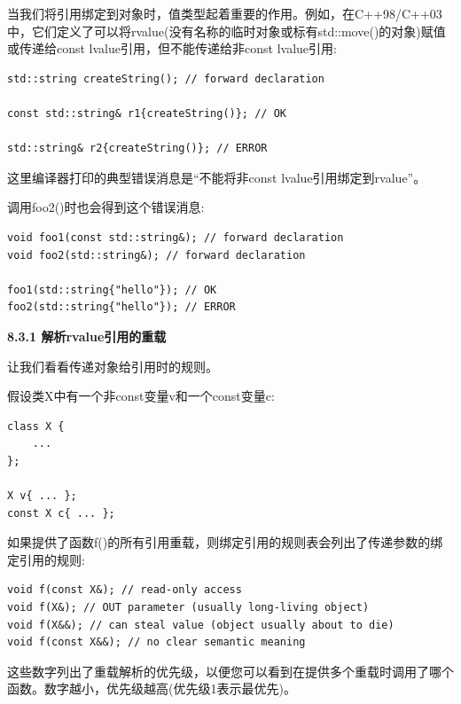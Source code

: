 当我们将引用绑定到对象时，值类型起着重要的作用。例如，在C++98/C++03中，它们定义了可以将rvalue(没有名称的临时对象或标有std::move()的对象)赋值或传递给const lvalue引用，但不能传递给非const lvalue引用:\par

\begin{lstlisting}[caption={}]
std::string createString(); // forward declaration

const std::string& r1{createString()}; // OK

std::string& r2{createString()}; // ERROR
\end{lstlisting}

这里编译器打印的典型错误消息是“不能将非const lvalue引用绑定到rvalue”。\par

调用foo2()时也会得到这个错误消息:\par

\begin{lstlisting}[caption={}]
void foo1(const std::string&); // forward declaration
void foo2(std::string&); // forward declaration

foo1(std::string{"hello"}); // OK
foo2(std::string{"hello"}); // ERROR
\end{lstlisting}

\hspace*{\fill} \par %
\textbf{8.3.1 解析rvalue引用的重载}

让我们看看传递对象给引用时的规则。\par

假设类X中有一个非const变量v和一个const变量c:\par

\begin{lstlisting}[caption={}]
class X {
	...
};

X v{ ... };
const X c{ ... };
\end{lstlisting}

如果提供了函数f()的所有引用重载，则绑定引用的规则表会列出了传递参数的绑定引用的规则:\par

\begin{lstlisting}[caption={}]
void f(const X&); // read-only access
void f(X&); // OUT parameter (usually long-living object)
void f(X&&); // can steal value (object usually about to die)
void f(const X&&); // no clear semantic meaning
\end{lstlisting}

这些数字列出了重载解析的优先级，以便您可以看到在提供多个重载时调用了哪个函数。数字越小，优先级越高(优先级1表示最优先)。\par

